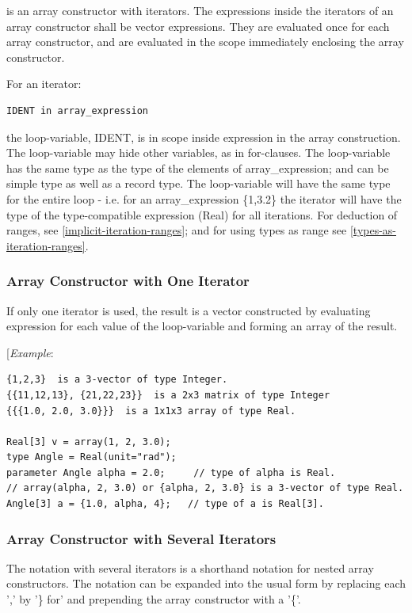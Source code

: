 \documentclass[10pt,a4paper]{report}
\def\doublelabel#1{\label{#1}}
\begin{document}
is an array constructor with iterators. The expressions inside the
iterators of an array constructor shall be vector expressions. They are
evaluated once for each array constructor, and are evaluated in the
scope immediately enclosing the array constructor.

For an iterator:
\begin{lstlisting}[language=modelica]
IDENT in array_expression
\end{lstlisting}

the loop-variable, IDENT, is in scope inside expression in the array
construction. The loop-variable may hide other variables, as in
for-clauses. The loop-variable has the same type as the type of the
elements of array\_expression; and can be simple type as well as a
record type. The loop-variable will have the same type for the entire
loop - i.e. for an array\_expression \{1,3.2\} the iterator will have
the type of the type-compatible expression (Real) for all iterations.
For deduction of ranges, see \ref{implicit-iteration-ranges}; and for using types as
range see \ref{types-as-iteration-ranges}.

\subsubsection{Array Constructor with One Iterator}\doublelabel{array-constructor-with-one-iterator}

If only one iterator is used, the result is a vector constructed by
evaluating expression for each value of the loop-variable and forming an
array of the result.

{[}\emph{Example}:
\begin{lstlisting}[language=modelica]
{1,2,3}  is a 3-vector of type Integer. 
{{11,12,13}, {21,22,23}}  is a 2x3 matrix of type Integer 
{{{1.0, 2.0, 3.0}}}  is a 1x1x3 array of type Real. 

Real[3] v = array(1, 2, 3.0); 
type Angle = Real(unit="rad");     
parameter Angle alpha = 2.0;     // type of alpha is Real. 
// array(alpha, 2, 3.0) or {alpha, 2, 3.0} is a 3-vector of type Real. 
Angle[3] a = {1.0, alpha, 4};   // type of a is Real[3].
\end{lstlisting}
\subsubsection{Array Constructor with Several Iterators}\doublelabel{array-constructor-with-several-iterators}

The notation with several iterators is a shorthand notation for nested
array constructors. The notation can be expanded into the usual form by
replacing each ',' by '\} for' and prepending the array constructor with
a '\{'.
\end{document}
